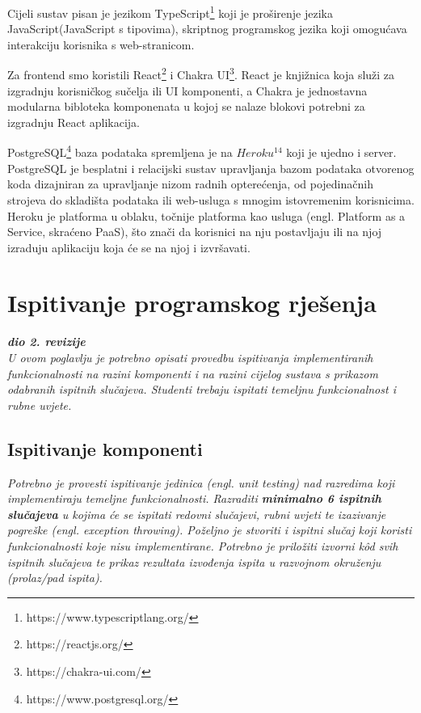 		Cijeli sustav pisan je jezikom TypeScript\footnote{https://www.typescriptlang.org/} koji je proširenje jezika JavaScript(JavaScript s tipovima), skriptnog programskog jezika koji omogućava interakciju korisnika s web-stranicom.
		
		Za frontend smo koristili React\footnote{https://reactjs.org/} i Chakra UI\footnote{https://chakra-ui.com/}. React je knjižnica koja služi za izgradnju korisničkog sučelja ili UI komponenti, a Chakra je jednostavna modularna bibloteka komponenata	u kojoj se nalaze blokovi potrebni za izgradnju React aplikacija.
		
		 PostgreSQL\footnote{https://www.postgresql.org/} baza podataka spremljena je na $Heroku^{14}$	koji je ujedno i server. PostgreSQL je besplatni i relacijski sustav upravljanja bazom podataka otvorenog koda dizajniran za upravljanje nizom radnih opterećenja, od pojedinačnih strojeva do skladišta podataka ili web-usluga s mnogim istovremenim korisnicima. Heroku je platforma u oblaku, točnije platforma kao usluga (engl. Platform as a Service, skraćeno PaaS), što znači da korisnici	na nju postavljaju ili na njoj izraduju aplikaciju koja će se na njoj i izvršavati.
		
			\eject 
		
	
		\section{Ispitivanje programskog rješenja}
			
			\textbf{\textit{dio 2. revizije}}\\
			
			 \textit{U ovom poglavlju je potrebno opisati provedbu ispitivanja implementiranih funkcionalnosti na razini komponenti i na razini cijelog sustava s prikazom odabranih ispitnih slučajeva. Studenti trebaju ispitati temeljnu funkcionalnost i rubne uvjete.}
	
			
			\subsection{Ispitivanje komponenti}
			\textit{Potrebno je provesti ispitivanje jedinica (engl. unit testing) nad razredima koji implementiraju temeljne funkcionalnosti. Razraditi \textbf{minimalno 6 ispitnih slučajeva} u kojima će se ispitati redovni slučajevi, rubni uvjeti te izazivanje pogreške (engl. exception throwing). Poželjno je stvoriti i ispitni slučaj koji koristi funkcionalnosti koje nisu implementirane. Potrebno je priložiti izvorni kôd svih ispitnih slučajeva te prikaz rezultata izvođenja ispita u razvojnom okruženju (prolaz/pad ispita). }
			
